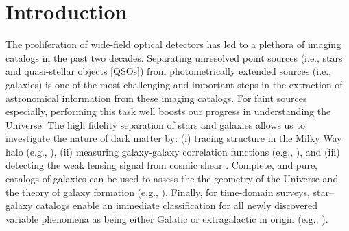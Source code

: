 \documentclass[twocolumn]{aastex62}
\begin{document}


\section{Introduction}\label{sec:intro}

The proliferation of wide-field optical detectors has led to a plethora of
imaging catalogs in the past two decades. Separating unresolved point sources (i.e., stars and quasi-stellar objects
[QSOs]) from photometrically extended sources (i.e., galaxies) is one of the
most challenging and important steps in the extraction of astronomical
information from these imaging catalogs. For faint sources especially,
performing this task well boosts our progress in understanding the Universe.
The high fidelity separation of stars and galaxies allows us to investigate
the nature of dark matter by: (i) tracing structure in the Milky Way halo
(e.g., \citealt{Belokurov06}), (ii) measuring galaxy-galaxy correlation
functions (e.g., \citealt{Ross11, Ho15}), and (iii) detecting the weak
lensing signal from cosmic shear \citep{Soumagnac15}. Complete, and pure,
catalogs of galaxies can be used to assess the the geometry of the Universe
\citep{Yasuda01} and the theory of galaxy formation (e.g.,
\citealt{Loveday12, Moorman15}). Finally, for time-domain surveys,
star--galaxy catalogs enable an immediate classification for all newly
discovered variable phenomena as being either Galatic or extragalactic in
origin (e.g., \citealt{Berger12,Miller17}).
\end{document}
